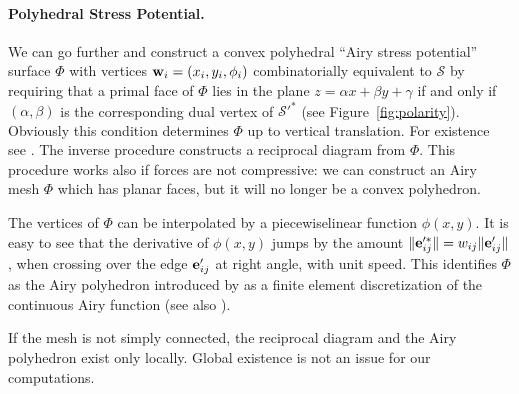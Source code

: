 \documentclass[review]{acmsiggraph}
\def\SS{{\mathcal S}}
\begin{document}
\paragraph{Polyhedral Stress Potential.}

We can go further and construct a convex polyhedral ``Airy stress 
potential'' surface $\Phi$ with vertices ${\mathbf w}_i=(x_i,y_i,\phi_i)$ 
combinatorially equivalent to $\SS$ by requiring that a primal face of 
$\Phi$ lies in the plane $z=\alpha x + \beta y + \gamma$ if and only if 
$(\alpha,\beta)$ is the corresponding dual vertex of $\SS'^*$ (see 
Figure~\ref{fig:polarity}). Obviously this condition determines $\Phi$ up 
to vertical translation. For existence see \cite{Ash1988}. The inverse 
procedure constructs a reciprocal diagram from $\Phi$. This procedure 
works also if forces are not compressive: we can construct an Airy mesh
$\Phi$ which has planar faces, but it will no longer be a convex 
polyhedron.

The vertices of $\Phi$ can be interpolated by a piecewise\dash linear 
function $\phi(x,y)$. It is easy to see that the derivative of $\phi(x,y)$ 
jumps by the amount $\|{\mathbf e}_{ij}'^*\| = w_{ij}\|{\mathbf e}_{ij}'\|$, when crossing 
over the edge ${\mathbf e}'_{ij}$ at right angle, with unit speed. This identifies 
$\Phi$ as the Airy polyhedron introduced by \cite{Fraternali2002a} as a 
finite element discretization of the continuous Airy function (see also 
\cite{Fraternali2010}).

If the mesh is not simply connected, the reciprocal diagram and the Airy 
polyhedron exist only locally. Global existence is not an issue for our
computations.
\end{document}
